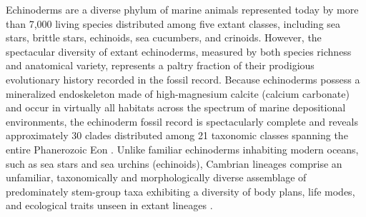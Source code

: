 \documentclass{article}
\begin{document}
Echinoderms are a diverse phylum of marine animals represented today by more than 7,000 living species \citep{brusca2003} distributed among five extant classes, including sea stars, brittle stars, echinoids, sea cucumbers, and crinoids. However, the spectacular diversity of extant echinoderms, measured by both species richness and anatomical variety, represents a paltry fraction of their prodigious evolutionary history recorded in the fossil record. Because echinoderms possess a mineralized endoskeleton made of high-magnesium calcite (calcium carbonate) and occur in virtually all habitats across the spectrum of marine depositional environments, the echinoderm fossil record is spectacularly complete and reveals approximately 30 clades distributed among 21 taxonomic classes spanning the entire Phanerozoic Eon \citep{SprinkleKier1987, Sumrall1997, SumrallWaters2012, ZamoraRahman2014, WrightEtAl2017, SheffieldSumrall2019}. Unlike familiar echinoderms inhabiting modern oceans, such as sea stars and sea urchins (echinoids), Cambrian lineages comprise an unfamiliar, taxonomically and morphologically diverse assemblage of predominately stem-group taxa exhibiting a diversity of body plans, life modes, and ecological traits unseen in extant lineages \citep{Sprinkle1973, ZamoraEtAl2013, ZamoraRahman2014}.
\end{document}
